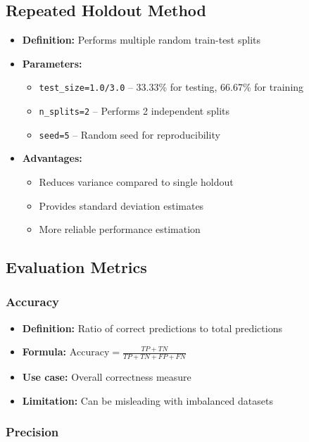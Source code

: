 \documentclass[12pt,a4paper]{article}
\begin{document}
\subsection{Repeated Holdout Method}

\begin{itemize}
    \item \textbf{Definition:} Performs multiple random train-test splits
    \item \textbf{Parameters:}
    \begin{itemize}
        \item \texttt{test\_size=1.0/3.0} -- 33.33\% for testing, 66.67\% for training
        \item \texttt{n\_splits=2} -- Performs 2 independent splits
        \item \texttt{seed=5} -- Random seed for reproducibility
    \end{itemize}
    \item \textbf{Advantages:}
    \begin{itemize}
        \item Reduces variance compared to single holdout
        \item Provides standard deviation estimates
        \item More reliable performance estimation
    \end{itemize}
\end{itemize}

\subsection{Evaluation Metrics}

\subsubsection{Accuracy}

\begin{itemize}
    \item \textbf{Definition:} Ratio of correct predictions to total predictions
    \item \textbf{Formula:} $\text{Accuracy} = \frac{TP + TN}{TP + TN + FP + FN}$
    \item \textbf{Use case:} Overall correctness measure
    \item \textbf{Limitation:} Can be misleading with imbalanced datasets
\end{itemize}

\subsubsection{Precision}
\end{document}
